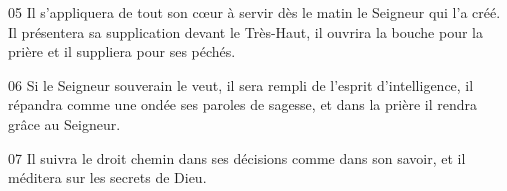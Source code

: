 
05 Il s’appliquera de tout son cœur à servir dès le matin le Seigneur qui l’a créé. Il présentera sa supplication devant le Très-Haut, il ouvrira la bouche pour la prière et il suppliera pour ses péchés.

06 Si le Seigneur souverain le veut, il sera rempli de l’esprit d’intelligence, il répandra comme une ondée ses paroles de sagesse, et dans la prière il rendra grâce au Seigneur.

07 Il suivra le droit chemin dans ses décisions comme dans son savoir, et il méditera sur les secrets de Dieu.


